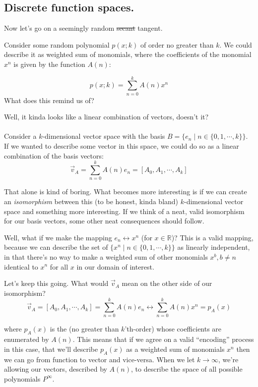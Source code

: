 \documentclass[letterpaper,12pt]{report}
\begin{document}
\subsection{Discrete function spaces.}

Now let's go on a seemingly random \sout{secant} tangent.\par
Consider some random polynomial \(p(x;k)\) of order no greater than \(k\).
We could describe it as weighted sum of monomials, where the coefficients
of the monomial \(x^n\) is given by the function \(A(n)\):

\[p(x;k) = \sum_{n=0}^{k}A(n) x^n\]
What does this remind us of?\par
Well, it kinda looks like a linear combination of vectors, doesn't it?
\\
\\
Consider a \(k\)-dimensional vector space with the basis
\(B = \{e_n \mid n \in \{0, 1, \cdots, k\}\}\).
If we wanted to describe some vector in this space, we could do so as a linear
combination of the basis vectors:
\[ \vec{v}_A = \sum_{n=0}^{k}A(n) e_n = [A_0, A_1, \cdots, A_k]\]

That alone is kind of boring. What becomes more interesting is if we can create an
\emph{isomorphism} between this
(to be honest, kinda bland) \(k\)-dimensional vector space and something
more interesting. If we think of a neat, valid isomorphism for our basis vectors,
some other neat consequences should follow. \par
Well, what if we make the mapping \(e_n \leftrightarrow x^n\) (for \(x \in \mathbb{R}\))?
This is a valid mapping, because we can describe the set of
\(\{x^n \mid n \in \{0, 1, \cdots, k\}\}\) as linearly independent, in that
there's no way to make a weighted sum of other monomials \(x^b, b\neq n\)
identical to \(x^n\) for all \(x\) in our domain of interest.\par
Let's keep this going. What would \(\vec{v}_A\) mean on the other side of our
isomorphism?
\[ \vec{v}_A = [A_0, A_1, \cdots, A_k] = \sum_{n=0}^{k}A(n) e_n
  \longleftrightarrow \sum_{n=0}^{k}A(n)x^n = p_A(x)  \]

where \(p_A(x)\) is the (no greater than \(k\)'th-order) whose coefficients
are enumerated by \(A(n)\). This means that if we agree on a valid ``encoding'' process
\textemdash{}
in this case, that we'll describe \(p_A(x)\) as a weighted sum of monomials \(x^n\)
\textemdash{}
then we can go from function to vector and vice-versa.
When we let \(k \rightarrow \infty\), we're allowing our vectors, described by \(A(n)\),
to describe the space of all possible polynomials \(P^\infty\).\par
\end{document}
